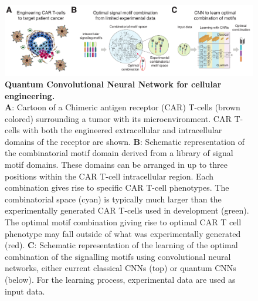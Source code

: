 \documentclass{article}
\begin{document}
\begin{figure}[ht]
    \centering
\includegraphics[width=.98\columnwidth, keepaspectratio]{figures/ws1_overview.pdf}
    \caption{\textbf{Quantum Convolutional Neural Network for cellular engineering.}\\
    \textbf{A}: Cartoon of a Chimeric antigen receptor (CAR) T-cells (brown colored) surrounding a tumor with its microenvironment. CAR T-cells with both the engineered extracellular and intracellular domains of the receptor are shown.  
    \textbf{B}: Schematic representation of the combinatorial motif domain derived from a library of signal motif domains.  These domains can be arranged in up to three positions within the CAR T-cell intracellular region. Each combination gives rise to specific CAR T-cell phenotypes. The combinatorial space (cyan) is typically much larger than the experimentally generated CAR T-cells used in development (green). The optimal motif combination giving rise to optimal CAR T cell phenotype may fall outside of what was experimentally generated (red).
    \textbf{C}: Schematic representation of the learning of the optimal combination of the signalling motifs using convolutional neural networks, either current classical CNNs (top) or quantum CNNs (below). For the learning process, experimental data are used as input data.
    }
    \label{fig:quantum-cell-engineering}
\end{figure}
\end{document}
